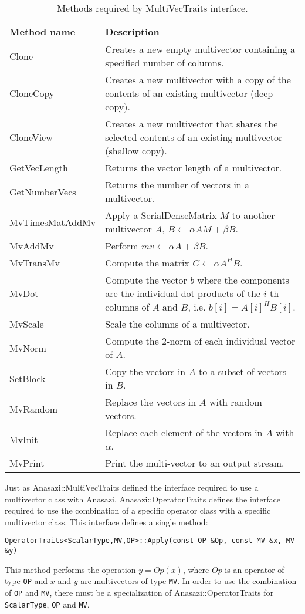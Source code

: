 \begin{table}
\begin{center}
\begin{tabular}{| p{4cm} || p{8cm} |}
\hline
Method name & Description \\
\hline\hline
Clone           & Creates a new empty multivector containing a specified number of columns.  \\\hline
CloneCopy       & Creates a new multivector with a copy of the contents of an existing multivector (deep copy). \\\hline
CloneView       & Creates a new multivector that shares the selected contents of an existing multivector (shallow copy).  \\\hline
GetVecLength    & Returns the vector length of a multivector.  \\\hline
GetNumberVecs   & Returns the number of vectors in a multivector.  \\\hline
MvTimesMatAddMv & Apply a SerialDenseMatrix $M$ to another multivector $A$, $B \leftarrow \alpha A M + \beta B$.  \\\hline
MvAddMv         & Perform $mv \leftarrow \alpha A + \beta B$.  \\\hline
MvTransMv       & Compute the matrix $C \leftarrow \alpha A^H B$.  \\\hline
MvDot           & Compute the vector $b$ where the components are the individual dot-products of the $i$-th columns of $A$ and $B$, i.e. $b[i] = A[i]^H B[i]$.  \\\hline
MvScale         & Scale the columns of a multivector. \\\hline
MvNorm          & Compute the 2-norm of each individual vector of $A$.  \\\hline
SetBlock        & Copy the vectors in $A$ to a subset of vectors in $B$. \\\hline
MvRandom        & Replace the vectors in $A$ with random vectors.  \\\hline
MvInit          & Replace each element of the vectors in $A$ with $\alpha$.  \\\hline
MvPrint         & Print the multi-vector to an output stream.  \\\hline
\hline
\end{tabular}
\caption{Methods required by MultiVecTraits interface.}
\label{tab:anasazi:mvt}
\end{center}
\end{table}

Just as Anasazi::MultiVecTraits defined the interface required to use a
multivector class with Anasazi, Anasazi::OperatorTraits defines the
interface required to use the combination of a specific operator class with a
specific multivector class. This interface defines a single method:
\begin{verbatim}
OperatorTraits<ScalarType,MV,OP>::Apply(const OP &Op, const MV &x, MV &y)
\end{verbatim}
This method performs the operation $y = Op(x)$, where $Op$ is an operator of type
\verb!OP! and $x$ and $y$ are multivectors of type \verb!MV!. In order to use the
combination of \verb!OP! and \verb!MV!, there must be a specialization of
Anasazi::OperatorTraits for \verb!ScalarType!, \verb!OP! and \verb!MV!. 

